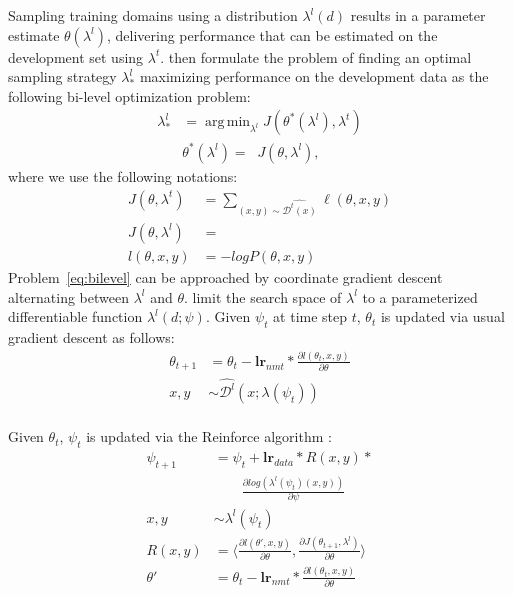 \documentclass[11pt,a4paper]{article}
\newcommand{\fyTodo}[1]{\Todo[FY:]{\textcolor{orange}{#1}}}
\DeclareMathOperator*{\argmin}{arg\,min}
\begin{document}
Sampling training domains using a distribution $\lambda^{l}(d)$ results in a parameter estimate $\theta(\lambda^{l})$, delivering performance that can be estimated on the development set using $\lambda^{t}$. \cite{Wang20optimizing,Wang20balancing} then formulate the problem of finding an optimal sampling strategy $\lambda^{l}_{*}$ maximizing performance on the development data as the following bi-level optimization problem:
\begin{equation} \label{eq:bilevel}
\begin{split}
\lambda^{l}_* &= \displaystyle{\mathop{\argmin}_{\lambda^{l}} J(\theta^*(\lambda^{l}), \lambda^{t})} \\
					& \theta^*(\lambda^{l}) = \displaystyle{\mathop{\argmin_{\theta}} J(\theta, \lambda^{l})}, 
\end{split}
\end{equation}
where we use the following notations:%
\begin{align*}
J(\theta, \lambda^{t} ) &= \displaystyle{\mathop{\sum}_{(x,y) \sim \widehat{\mathcal{D}^{t}(x)}} \ell(\theta,x,y)} \\
J(\theta, \lambda^{l}) &= \displaystyle{\mathop{E_{(x,y) \sim \widehat{\mathcal{D}^{l}(x)}}[\ell(\theta,x,y)]}} \\
l(\theta,x,y) &= - log P(\theta,x,y)
\end{align*}
Problem~\eqref{eq:bilevel} can be approached by coordinate gradient descent alternating between $\lambda^{l}$ and $\theta$. \citet{Wang20balancing} limit the search space of $\lambda^{l}$ to a parameterized differentiable function $\lambda^{l}(d; \psi)$. Given $\psi_t$ at time step $t$, $\theta_t$ is updated via usual gradient descent as follows:
\begin{align*}
\theta_{t+1} &= \theta_t - \mathbf{lr}_{nmt} * \frac{\partial l(\theta_t, x,y)}{\partial \theta} \\
x,y &\sim \widehat{\mathcal{D}^l}(x;\lambda(\psi_t)) \\
\end{align*}

Given $\theta_t$, $\psi_t$ is updated via the Reinforce algorithm \cite{Williams92reinforce}:\fyTodo{Rewrite this correctly with domain average reward}
\begin{align*}
  \psi_{t+1} &= \psi_t + \mathbf{lr}_{data} * R(x,y) * \\
  & \quad\quad \frac{\partial log(\lambda^l(\psi_t)(x,y))}{\partial \psi} \\
x,y &\sim \lambda^l (\psi_t) \\
R(x,y) &= \langle \frac{\partial l(\theta',x,y)}{\partial \theta}, \frac{\partial J(\theta_{t+1}, \lambda^l)}{\partial \theta} \rangle \\
\theta' &= \theta_t - \mathbf{lr}_{nmt} * \frac{\partial l(\theta_t, x,y)}{\partial \theta} \\
\end{align*}
\end{document}
